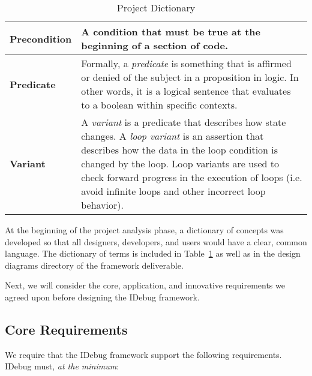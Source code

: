 \documentclass{article}
\begin{document}
\begin{table}[htbp]
\begin{center}
\begin{tabular}{|l|p{4in}|}
        \textbf{Precondition} & 
        A condition that must be true at the beginning of a
        section of code. \\ \hline 

        \textbf{Predicate} & 
        Formally, a \emph{predicate} is something that is
        affirmed or denied of the subject in a proposition in
        logic. In other words, it is a logical sentence that
        evaluates to a boolean within specific contexts. \\ \hline

        \textbf{Variant} & 
        A \emph{variant} is a predicate that describes how
        state changes. A \emph{loop variant} is an assertion
        that describes how the data in the loop condition is
        changed by the loop.  Loop variants are used to
        check forward progress in the execution of loops (i.e.
        avoid infinite loops and other incorrect loop behavior). \\ \hline
    \end{tabular}
    \caption{Project Dictionary}
    \label{tab:dictionary}
  \end{center}
\end{table}

At the beginning of the project analysis phase, a dictionary of
concepts was developed so that all designers, developers, and users
would have a clear, common language.  The dictionary of terms is
included in Table~\ref{tab:dictionary} as well as in the design
diagrams directory of the framework deliverable.

Next, we will consider the core, application, and innovative
requirements we agreed upon before designing the IDebug framework.

\subsection{Core Requirements}
\label{sec:core}

We require that the IDebug framework support the following
requirements.  IDebug must, \emph{at the minimum}:
\end{document}
